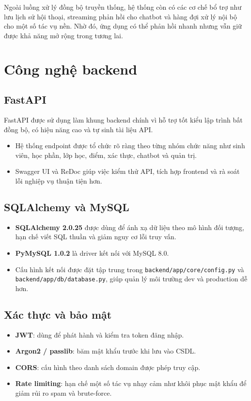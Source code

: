 \documentclass[12pt,a4paper]{report}
\begin{document}
Ngoài luồng xử lý đồng bộ truyền thống, hệ thống còn có các cơ chế bổ trợ như lưu lịch sử hội thoại, streaming phản hồi cho chatbot và hàng đợi xử lý nội bộ cho một số tác vụ nền. Nhờ đó, ứng dụng có thể phản hồi nhanh nhưng vẫn giữ được khả năng mở rộng trong tương lai.

\section{Công nghệ backend}
\subsection{FastAPI}
FastAPI được sử dụng làm khung backend chính vì hỗ trợ tốt kiểu lập trình bất đồng bộ, có hiệu năng cao và tự sinh tài liệu API.
\begin{itemize}
    \item Hệ thống endpoint được tổ chức rõ ràng theo từng nhóm chức năng như sinh viên, học phần, lớp học, điểm, xác thực, chatbot và quản trị.
    \item Swagger UI và ReDoc giúp việc kiểm thử API, tích hợp frontend và rà soát lỗi nghiệp vụ thuận tiện hơn.
\end{itemize}

\subsection{SQLAlchemy và MySQL}
\begin{itemize}
    \item \textbf{SQLAlchemy 2.0.25} được dùng để ánh xạ dữ liệu theo mô hình đối tượng, hạn chế viết SQL thuần và giảm nguy cơ lỗi truy vấn.
    \item \textbf{PyMySQL 1.0.2} là driver kết nối với MySQL 8.0.
    \item Cấu hình kết nối được đặt tập trung trong \texttt{backend/app/core/config.py} và \texttt{backend/app/db/database.py}, giúp quản lý môi trường dev và production dễ hơn.
\end{itemize}

\subsection{Xác thực và bảo mật}
\begin{itemize}
    \item \textbf{JWT}: dùng để phát hành và kiểm tra token đăng nhập.
    \item \textbf{Argon2 / passlib}: băm mật khẩu trước khi lưu vào CSDL.
    \item \textbf{CORS}: cấu hình theo danh sách domain được phép truy cập.
    \item \textbf{Rate limiting}: hạn chế một số tác vụ nhạy cảm như khôi phục mật khẩu để giảm rủi ro spam và brute-force.
\end{itemize}
\end{document}
